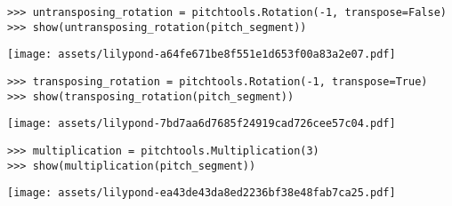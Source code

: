 \begin{comment}
<abjad>
untransposing_rotation = pitchtools.Rotation(-1, transpose=False)
show(untransposing_rotation(pitch_segment))
transposing_rotation = pitchtools.Rotation(-1, transpose=True)
show(transposing_rotation(pitch_segment))
</abjad>
\end{comment}

\begin{abjadbookoutput}
\begin{singlespacing}
\vspace{-0.5\baselineskip}
\begin{lstlisting}
>>> untransposing_rotation = pitchtools.Rotation(-1, transpose=False)
>>> show(untransposing_rotation(pitch_segment))
\end{lstlisting}
\noindent\texttt{[image: assets/lilypond-a64fe671be8f551e1d653f00a83a2e07.pdf]}
\begin{lstlisting}
>>> transposing_rotation = pitchtools.Rotation(-1, transpose=True)
>>> show(transposing_rotation(pitch_segment))
\end{lstlisting}
\noindent\texttt{[image: assets/lilypond-7bd7aa6d7685f24919cad726cee57c04.pdf]}
\end{singlespacing}
\end{abjadbookoutput}

\begin{comment}
<abjad>
multiplication = pitchtools.Multiplication(3)
show(multiplication(pitch_segment))
</abjad>
\end{comment}

\begin{abjadbookoutput}
\begin{singlespacing}
\vspace{-0.5\baselineskip}
\begin{lstlisting}
>>> multiplication = pitchtools.Multiplication(3)
>>> show(multiplication(pitch_segment))
\end{lstlisting}
\noindent\texttt{[image: assets/lilypond-ea43de43da8ed2236bf38e48fab7ca25.pdf]}
\end{singlespacing}
\end{abjadbookoutput}

\begin{comment}
<abjad>
pitch_operation = pitchtools.PitchOperation(
    operators=(
        pitchtools.Rotation(1),
        pitchtools.Transposition(2),
        ),
    )
show(pitch_operation(pitch_segment))
</abjad>
\end{comment}

